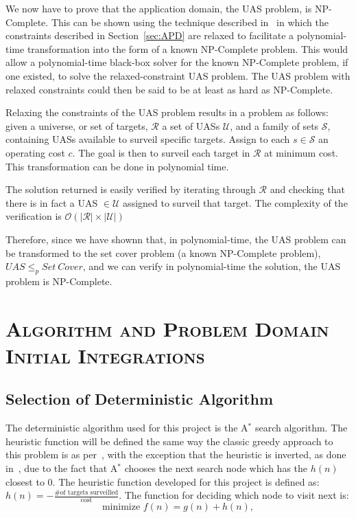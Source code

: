 \documentclass[conference]{IEEEtran}
\newcommand{\heuristic}{${h(n) = -\frac{\text{\# of targets
surveilled}}{\text{cost}}}$}
\newcommand{\bigoh}[1]{\ensuremath{\mathcal{O}(#1)}}		%
\begin{document}
We now have to prove that the application domain, the UAS problem, is
NP-Complete. This can be shown using the technique described
in~\cite{586textbook} in which the constraints described in
Section~\ref{sec:APD} are relaxed to facilitate a polynomial-time
transformation into the form of a known NP-Complete problem. This would allow a
polynomial-time black-box solver for the known NP-Complete problem, if one
existed, to solve the relaxed-constraint UAS problem. The UAS problem with
relaxed constraints could then be said to be at least as hard as NP-Complete.

Relaxing the constraints of the UAS problem results in a problem as follows:
given a universe, or set of targets, $\mathcal{R}$ a set of UASs $\mathcal{U}$,
and a family of sets $\mathcal{S}$, containing UASs available to surveil
specific targets. Assign to each $s \in \mathcal{S}$ an operating cost $c$. The
goal is then to surveil each target in $\mathcal{R}$ at minimum cost. This
transformation can be done in polynomial time.

The solution returned is easily verified by iterating through $\mathcal{R}$ and
checking that there is in fact a UAS $\in \mathcal{U}$ assigned to surveil that
target. The complexity of the verification is ${\bigoh{|\mathcal{R}| \times
|\mathcal{U}|}}$

Therefore, since we have shownn that, in polynomial-time, the UAS problem can
be transformed to the set cover problem (a known NP-Complete problem),
${\mathit{UAS} \leq_p \mathit{Set\ Cover}}$, and we can verify in
polynomial-time the solution, the UAS problem is NP-Complete.


\section{\textsc{Algorithm and Problem Domain Initial Integrations}} \label{sec:initIntegration}

\subsection{Selection of Deterministic Algorithm} \label{sec:detAlg}

The deterministic algorithm used for this project is the A$^*$ search
algorithm. The heuristic function will be defined the same way the classic
greedy approach to this problem is as per~\cite{wiki:SCP}, with the exception
that the heuristic is inverted, as done in~\cite{pjcvphw8}, due to the fact
that A$^*$ chooses the next search node which has the $h(n)$ closest to $0$.
The heuristic function developed for this project is defined as: \heuristic.
The function for deciding which node to visit next is: \[ \text{minimize } f(n)
= g(n) + h(n), \]
\end{document}
